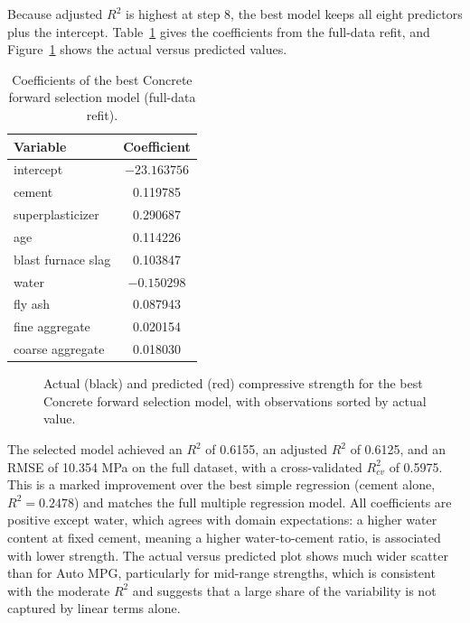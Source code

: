 \vspace{0.3cm}

Because adjusted $R^2$ is highest at step 8, the best model keeps all eight predictors plus the intercept. Table~\ref{tab:fs-concrete-coef} gives the coefficients from the full-data refit, and Figure~\ref{fig:fs-concrete-fit} shows the actual versus predicted values.

\begin{table}[H]
    \centering
    \caption{Coefficients of the best Concrete forward selection model (full-data refit).}
    \label{tab:fs-concrete-coef}
    \begin{tabular}{lc}
        \hline
        Variable & Coefficient \\
        \hline
        intercept & $-23.163756$ \\
        cement & 0.119785 \\
        superplasticizer & 0.290687 \\
        age & 0.114226 \\
        blast furnace slag & 0.103847 \\
        water & $-0.150298$ \\
        fly ash & 0.087943 \\
        fine aggregate & 0.020154 \\
        coarse aggregate & 0.018030 \\
        \hline
    \end{tabular}
\end{table}

\begin{figure}[H]
    \centering
    \caption{Actual (black) and predicted (red) compressive strength for the best Concrete forward selection model, with observations sorted by actual value.}
    \label{fig:fs-concrete-fit}
\end{figure}

The selected model achieved an $R^2$ of 0.6155, an adjusted $R^2$ of 0.6125, and an RMSE of 10.354 MPa on the full dataset, with a cross-validated $R^2_{cv}$ of 0.5975. This is a marked improvement over the best simple regression (cement alone, $R^2 = 0.2478$) and matches the full multiple regression model. All coefficients are positive except water, which agrees with domain expectations: a higher water content at fixed cement, meaning a higher water-to-cement ratio, is associated with lower strength. The actual versus predicted plot shows much wider scatter than for Auto MPG, particularly for mid-range strengths, which is consistent with the moderate $R^2$ and suggests that a large share of the variability is not captured by linear terms alone.

